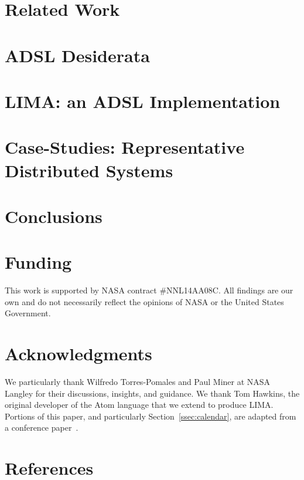 \documentclass{AIAA}
\begin{document}

\section{Related Work}
\label{sec:current}



\section{ADSL Desiderata}
\label{sec:towards-adsl}



\section{LIMA: an ADSL Implementation}
\label{sec:adsl}



\section{Case-Studies: Representative Distributed Systems}
\label{sec:case-studies}






\section{Conclusions}
\label{sec:future-work}


\section*{Funding}
This work is supported by NASA contract \#NNL14AA08C. All findings are our own and do not necessarily reflect the opinions of NASA or the United States Government.

\section*{Acknowledgments}
We particularly thank Wilfredo Torres-Pomales and Paul Miner at NASA Langley for their discussions, insights, and guidance. We thank Tom Hawkins, the original developer of the Atom language that we extend to produce LIMA.
Portions of this paper, and particularly Section~\ref{ssec:calendar}, are adapted from a conference paper~\cite{jones:nfm17}.

\section*{References}

%

\end{document}
